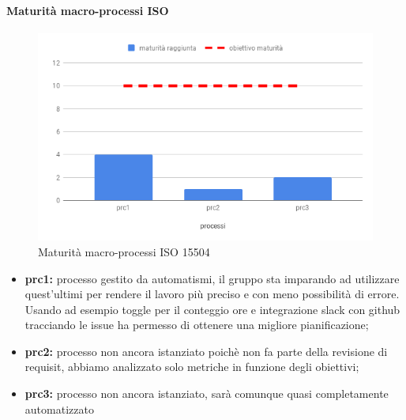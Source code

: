 \paragraph{Maturità macro-processi ISO }
\hspace{15cm}
\begin{figure}[h!]
	\centering
	\includegraphics[scale=0.5]{MaturitaProcessi.png}
	\caption{Maturità macro-processi ISO 15504}
\end{figure}
\begin{itemize}
	\item \textbf{prc1:} processo gestito da automatismi, il gruppo sta imparando ad utilizzare quest'ultimi per rendere il lavoro più preciso e con meno possibilità di errore. Usando ad esempio toggle per il conteggio ore e integrazione slack con github tracciando le issue ha
	permesso di ottenere una migliore pianificazione;
	\item \textbf{prc2:} processo non ancora istanziato poichè non fa parte della revisione di requisit, abbiamo analizzato solo metriche in funzione degli obiettivi;
	\item \textbf{prc3:} processo non ancora istanziato, sarà comunque quasi completamente automatizzato
\end{itemize}
\clearpage
